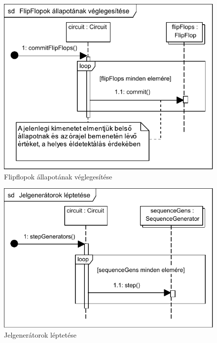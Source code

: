 \begin{figure}[H]
\begin{center}
\includegraphics{chapters/chapter04/seqdiagrams/new/commitFlipFlops.pdf}
\caption{Flipflopok állapotának véglegesítése}
\label{fig:commitFlipFlops}
\end{center}
\end{figure}

\begin{figure}[H]
\begin{center}
\includegraphics{chapters/chapter04/seqdiagrams/new/stepGenerators.pdf}
\caption{Jelgenerátorok léptetése}
\label{fig:step_gens}
\end{center}
\end{figure}


